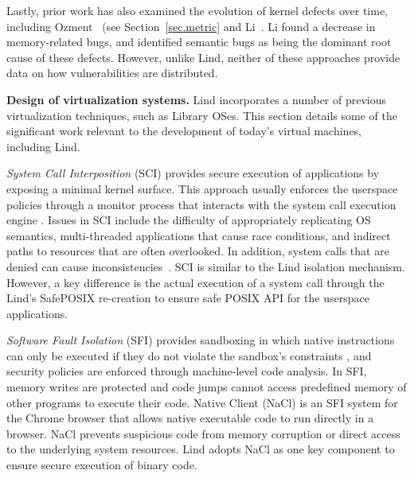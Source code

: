 Lastly, prior work has also examined the evolution of kernel defects over time, including
Ozment~\cite{ozment2006milk} (see Section~\ref{sec.metric} and Li~\cite{li2006have}.
Li found a decrease in memory-related
bugs, and identified semantic bugs as being the dominant root cause of these
defects.
However, unlike Lind, neither of these approaches provide data
on how vulnerabilities are distributed.


\textbf{Design of virtualization systems.}
Lind incorporates a number of previous virtualization techniques, such as Library OSes.
This section details some
of the significant work relevant to the development of today's virtual machines,
including Lind.

\textit{System Call Interposition} (SCI) provides
secure execution of applications by exposing a minimal kernel surface.
This approach usually enforces the userspace policies through a monitor process that
interacts with the system call execution engine
\cite{SCI-04}.
Issues in SCI include the difficulty of appropriately replicating OS semantics,
multi-threaded applications that cause race conditions, and indirect paths to
resources that are often overlooked.
In addition, system calls that are denied can cause inconsistencies~\cite{Problems-SCI}.
SCI is similar to the Lind isolation mechanism. However, a key difference is the actual execution
of a system call through the Lind's SafePOSIX re-creation to ensure safe POSIX API for the userspace applications.

\textit{Software Fault Isolation} (SFI)
provides sandboxing in which native
instructions can only be executed if they do not violate the sandbox's
constraints \cite{SFI:93}, and security policies are enforced through machine-level
code analysis. In SFI, memory
writes are protected and code jumps cannot access predefined memory of
other programs to execute their code.
Native Client (NaCl) \cite{NaCl-09} is an SFI system for the
Chrome browser that allows native executable code to run directly in a
browser. NaCl prevents suspicious code
from memory corruption or direct access to the underlying system
resources. Lind adopts NaCl as one key component to ensure secure execution
of binary code.

